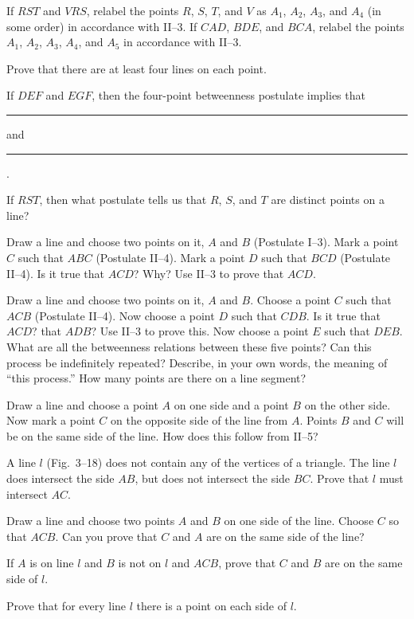 \documentclass[11pt]{book}
\theoremstyle{bkplain}
\begin{document}
\begin{exercisecols}
\begin{exlist}[start=8]
\item If $RST$ and $VRS$, relabel the points $R$, $S$, $T$, and $V$ as $A_1$,
      $A_2$, $A_3$, and $A_4$ (in some order) in accordance with II--3. If
      $CAD$, $BDE$, and $BCA$, relabel the points $A_1$, $A_2$, $A_3$, $A_4$, and
      $A_5$ in accordance with II--3.
\item Prove that there are at least four lines on each point.
\item If $DEF$ and $EGF$, then the four-point betweenness postulate implies that
      \rule{2.2em}{0.4pt} and \rule{2.6em}{0.4pt}.
\item If $RST$, then what postulate tells us that $R$, $S$, and $T$ are distinct
      points on a line?
\item[\stex 12.] Draw a line and choose two points on it, $A$ and $B$ (Postulate
      I--3). Mark a point $C$ such that $ABC$ (Postulate II--4). Mark a point $D$
      such that $BCD$ (Postulate II--4). Is it true that $ACD$? Why? Use II--3 to
      prove that $ACD$.
\item[\stex 13.] Draw a line and choose two points on it, $A$ and $B$. Choose a
      point $C$ such that $ACB$ (Postulate II--4). Now choose a point $D$ such
      that $CDB$. Is it true that $ACD$? that $ADB$? Use II--3 to prove this.
      Now choose a point $E$ such that $DEB$. What are all the betweenness
      relations between these five points? Can this process be indefinitely
      repeated? Describe, in your own words, the meaning of ``this process.'' How
      many points are there on a line segment?
\item[\stex 14.] Draw a line and choose a point $A$ on one side and a point $B$ on
      the other side. Now mark a point $C$ on the opposite side of the line from
      $A$. Points $B$ and $C$ will be on the same side of the line. How does this
      follow from II--5?
\item[\stex 15.] A line $l$ (Fig.~3--18) does not contain any of the vertices of
      a triangle. The line $l$ does intersect the side $AB$, but does not
      intersect the side $BC$. Prove that $l$ must intersect $AC$.
\exfig{\FIGIIIEIGHTEEN}
\item[\stex 16.] Draw a line and choose two points $A$ and $B$ on one side of the
      line. Choose $C$ so that $ACB$. Can you prove that $C$ and $A$ are on the
      same side of the line?
\item[\stex 17.] If $A$ is on line $l$ and $B$ is not on $l$ and $ACB$, prove
      that $C$ and $B$ are on the same side of $l$.
\item[\stex 18.] Prove that for every line $l$ there is a point on each side of
      $l$.
\end{exlist}
\end{exercisecols}
\end{document}
